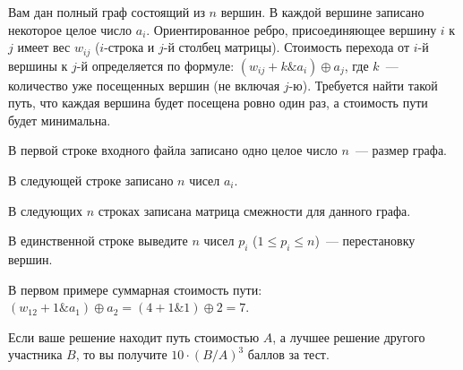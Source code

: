 
\Legend
Вам дан полный граф состоящий из $n$ вершин. В каждой вершине записано некоторое целое число $a_i$. Ориентированное ребро,
присоединяющее вершину $i$ к $j$ имеет вес $w_{ij}$ ($i$-строка и $j$-й столбец матрицы). Стоимость перехода от $i$-й
вершины к $j$-й определяется по формуле: $(w_{ij} + k \& a_{i}) \oplus a_{j}$, где $k$~--- количество уже посещенных
вершин (не включая $j$-ю). Требуется найти такой путь, что каждая вершина будет посещена ровно один раз, а стоимость пути
будет минимальна.

\Input
В первой строке входного файла записано одно целое число $n$~--- размер графа.

В следующей строке записано $n$ чисел $a_i$.

В следующих $n$ строках записана матрица смежности для данного графа.

\Output
В единственной строке выведите $n$ чисел $p_i$ ($1 \le p_i \le n$)~--- перестановку вершин.

\Samples
\BeginTests
{}
\EndTests

В первом примере суммарная стоимость пути: $(w_{12} + 1 \& a_{1}) \oplus a_{2} = (4 + 1 \& 1) \oplus 2 = 7$.

\Scoring
Если ваше решение находит путь стоимостью $A$, а лучшее решение другого участника $B$, то вы получите
$10 \cdot (B/A)^3$ баллов за тест.

\EndProblem
